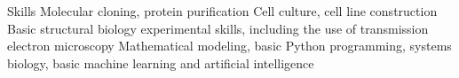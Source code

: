 
\begin{rubric}{Skills}
\entry*[] Molecular cloning, protein purification
\entry*[] Cell culture, cell line construction
\entry*[] Basic structural biology experimental skills, including the use of transmission electron microscopy
\entry*[] Mathematical modeling, basic Python programming, systems biology, basic machine learning and artificial intelligence
\end{rubric}
